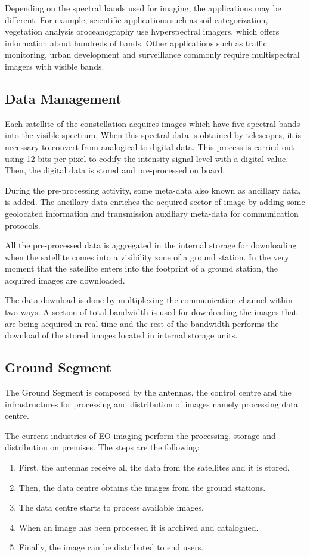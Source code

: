 Depending on the spectral bands used for imaging, the applications may be
different. For example, scientific applications such as soil categorization,
vegetation analysis oroceanography use hyperspectral imagers, which offers
information about hundreds of bands. Other applications such as traffic monitoring,
urban development and surveillance commonly require multispectral imagers with visible bands.

\subsection{Data Management}

Each satellite of the constellation acquires images which have five spectral
bands into the visible spectrum. When this spectral data is
obtained by telescopes, it is necessary to convert from analogical to digital
data. This process is carried out using 12 bits per pixel to codify the
intensity signal level with a digital value. Then, the digital data is stored and pre-processed on
board.

During the pre-processing activity, some meta-data also known as ancillary
data, is added. The ancillary data enriches the acquired sector of image by adding
some geolocated information and transmission auxiliary meta-data for communication
protocols.

All the pre-processed data is aggregated in the
internal storage for downloading when the satellite comes into a visibility zone
of a ground station. In the very moment that the satellite enters into the footprint of a
ground station, the acquired images are downloaded.

The data download is done by multiplexing the
communication channel within two ways. A section of total bandwidth
is used for downloading the images that are being acquired in real time and the
rest of the bandwidth performs the download of the stored images located in
internal storage units.

\subsection{Ground Segment}

The Ground Segment is composed by the antennas, the control centre and the
infrastructures for processing and distribution of images namely processing
data centre.

The current industries of \ac{EO} imaging perform the processing, storage and distribution on premises. The steps are the following:
\begin{enumerate}
\item First, the antennas receive all the data from the satellites and it is stored.
\item Then, the data centre obtains the images from the ground stations.
\item The data centre starts to process available images.
\item When an image has been processed it is archived and catalogued.
\item Finally, the image can be distributed to end users.
\end{enumerate}

